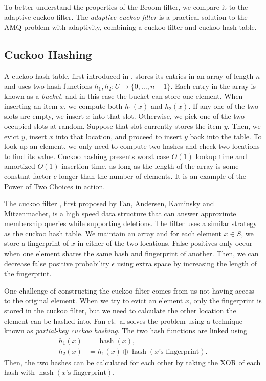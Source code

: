 \documentclass[../paper.tex]{subfiles}
\begin{document}
\newcommand{\on}{\operatorname}
To better understand the properties of the Broom filter, we compare it to the adaptive cuckoo filter.
The \emph{adaptive cuckoo filter} \cite{adaptive-cuckoo} is a practical solution to the AMQ problem with adaptivity, combining a cuckoo filter and cuckoo hash table.

\subsection{Cuckoo Hashing}
A cuckoo hash table, first introduced in \cite{cuckoo-hash}, stores its entries in an array of length $n$ and uses two hash functions $h_1,h_2:U\to \{0,\ldots,n-1\}$.
Each entry in the array is known as a \emph{bucket}, and in this case the bucket can store one element. When inserting an item $x$, we compute both $h_1(x)$ and $h_2(x)$. If any one of the two slots are empty, we insert $x$ into that slot.
Otherwise, we pick one of the two occupied slots at random. Suppose that slot currently stores the item $y$. Then, we evict $y$, insert $x$ into that location,
and proceed to insert $y$ back into the table. To look up an element, we only need to compute two hashes and check two locations to find its value.
Cuckoo hashing presents worst case $O(1)$ lookup time and amortized $O(1)$ insertion time, as long as the length of the array is some constant factor $c$ longer
than the number of elements. It is an example of the Power of Two Choices in action.

The cuckoo filter \cite{cuckoo-filter}, first proposed by Fan, Andersen, Kaminsky and Mitzenmacher, is a high speed data structure that can answer approximte membership queries while supporting deletions.
The filter uses a similar strategy as the cuckoo hash table. We maintain an array and for each element $x\in S$, we store a fingerprint of $x$ in either of the two locations. False positives only occur when one element shares the same hash and fingerprint of another. Then, we can decrease false positive probability $\epsilon$ using extra space by increasing the length of the fingerprint.

One challenge of constructing the cuckoo filter comes from us not having access to the original element. When we try to evict an element $x$, only the fingerprint
is stored in the cuckoo filter, but we need to calculate the other location the element can be hashed into. Fan et.\ al solves the problem using a technique known as \emph{partial-key cuckoo hashing}.
The two hash functions are linked using \begin{align*}
    h_1(x)&=\on{hash}(x), \\ h_2(x)&=h_1(x)\oplus \on{hash}(x\text{'s fingerprint}).
\end{align*} Then, the two hashes can be calculated for each other by taking the XOR of each hash with $\on{hash}(x\text{'s fingerprint})$.
\end{document}
